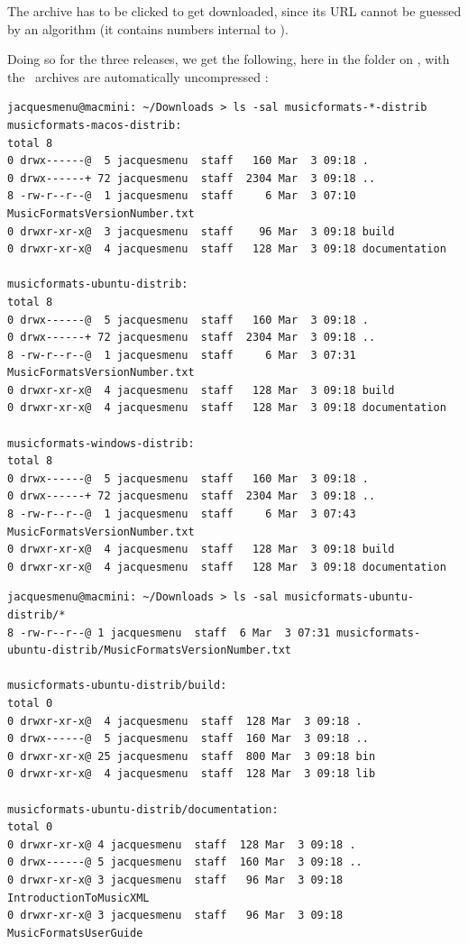 The  archive has to be clicked to get downloaded, since its URL cannot be guessed by an algorithm (it contains numbers internal to \github).

Doing so for the three releases, we get the following, here in the  folder on \MacOS, with the \zip\ archives are automatically uncompressed :
\begin{lstlisting}[language=Terminal]
jacquesmenu@macmini: ~/Downloads > ls -sal musicformats-*-distrib
musicformats-macos-distrib:
total 8
0 drwx------@  5 jacquesmenu  staff   160 Mar  3 09:18 .
0 drwx------+ 72 jacquesmenu  staff  2304 Mar  3 09:18 ..
8 -rw-r--r--@  1 jacquesmenu  staff     6 Mar  3 07:10 MusicFormatsVersionNumber.txt
0 drwxr-xr-x@  3 jacquesmenu  staff    96 Mar  3 09:18 build
0 drwxr-xr-x@  4 jacquesmenu  staff   128 Mar  3 09:18 documentation

musicformats-ubuntu-distrib:
total 8
0 drwx------@  5 jacquesmenu  staff   160 Mar  3 09:18 .
0 drwx------+ 72 jacquesmenu  staff  2304 Mar  3 09:18 ..
8 -rw-r--r--@  1 jacquesmenu  staff     6 Mar  3 07:31 MusicFormatsVersionNumber.txt
0 drwxr-xr-x@  4 jacquesmenu  staff   128 Mar  3 09:18 build
0 drwxr-xr-x@  4 jacquesmenu  staff   128 Mar  3 09:18 documentation

musicformats-windows-distrib:
total 8
0 drwx------@  5 jacquesmenu  staff   160 Mar  3 09:18 .
0 drwx------+ 72 jacquesmenu  staff  2304 Mar  3 09:18 ..
8 -rw-r--r--@  1 jacquesmenu  staff     6 Mar  3 07:43 MusicFormatsVersionNumber.txt
0 drwxr-xr-x@  4 jacquesmenu  staff   128 Mar  3 09:18 build
0 drwxr-xr-x@  4 jacquesmenu  staff   128 Mar  3 09:18 documentation
\end{lstlisting}

\begin{lstlisting}[language=Terminal]
jacquesmenu@macmini: ~/Downloads > ls -sal musicformats-ubuntu-distrib/*
8 -rw-r--r--@ 1 jacquesmenu  staff  6 Mar  3 07:31 musicformats-ubuntu-distrib/MusicFormatsVersionNumber.txt

musicformats-ubuntu-distrib/build:
total 0
0 drwxr-xr-x@  4 jacquesmenu  staff  128 Mar  3 09:18 .
0 drwx------@  5 jacquesmenu  staff  160 Mar  3 09:18 ..
0 drwxr-xr-x@ 25 jacquesmenu  staff  800 Mar  3 09:18 bin
0 drwxr-xr-x@  4 jacquesmenu  staff  128 Mar  3 09:18 lib

musicformats-ubuntu-distrib/documentation:
total 0
0 drwxr-xr-x@ 4 jacquesmenu  staff  128 Mar  3 09:18 .
0 drwx------@ 5 jacquesmenu  staff  160 Mar  3 09:18 ..
0 drwxr-xr-x@ 3 jacquesmenu  staff   96 Mar  3 09:18 IntroductionToMusicXML
0 drwxr-xr-x@ 3 jacquesmenu  staff   96 Mar  3 09:18 MusicFormatsUserGuide
\end{lstlisting}

